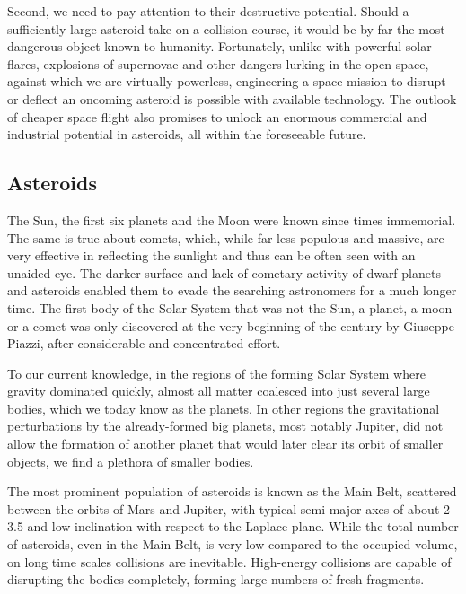     Second, we need to pay attention to their destructive potential.
    Should a sufficiently large asteroid take on a collision course,
    it would be by far the most dangerous object known to humanity.
    Fortunately, unlike with powerful solar flares, explosions of supernovae and other
    dangers lurking in the open space, against which we are virtually powerless,
    engineering a space mission to disrupt or deflect an oncoming asteroid is possible with available technology.
    The outlook of cheaper space flight also promises to unlock an enormous
    commercial and industrial potential in asteroids, all within the foreseeable future.

    \subsection{Asteroids} \label{iaa}
        The Sun, the first six planets and the Moon were known since times immemorial.
        The same is true about comets, which, while far less populous and massive,
        are very effective in reflecting the sunlight and thus can be often seen with an unaided eye.
        The darker surface and lack of cometary activity of dwarf planets and asteroids enabled them
        to evade the searching astronomers for a much longer time.
        The first body of the Solar System that was not the Sun, a planet, a moon or a comet was only discovered at
        the very beginning of the  century by Giuseppe Piazzi, after considerable and concentrated effort.

        To our current knowledge, in the regions of the forming Solar System where gravity dominated quickly,
        almost all matter coalesced into just several large bodies, which we today know as the planets.
        In other regions the gravitational perturbations by the already-formed big planets, most notably Jupiter,
        did not allow the formation of another planet that would later clear its orbit of smaller objects,
        we find a plethora of smaller bodies.

        The most prominent population of asteroids is known as the Main Belt, scattered between the orbits
        of Mars and Jupiter, with typical semi-major axes of about \SIrange{2}{3.5}{\au} and low inclination
        with respect to the Laplace plane. While the total number of asteroids, even in the Main Belt,
        is very low compared to the occupied volume, on long time scales collisions are inevitable.
        High-energy collisions are capable of disrupting the bodies completely, forming large numbers of fresh fragments.

